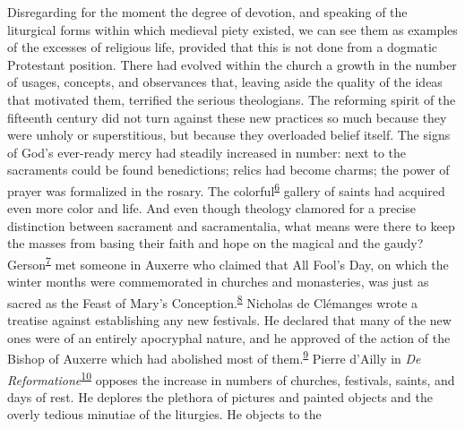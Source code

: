 Disregarding for the moment the degree of devotion, and speaking of the
liturgical forms within which medieval piety existed, we can see them as
examples of the excesses of religious life, provided that this is not
done from a dogmatic Protestant position. There had evolved within the
church a growth in the number of usages, concepts, and observances that,
leaving aside the quality of the ideas that motivated them, terrified
the serious theologians. The reforming spirit of the fifteenth century
did not turn against these new practices so much because they were
unholy or superstitious, but because they overloaded belief itself. The
signs of God's
ever-\protect\hypertarget{13_Chapter_Six__THE_DEPICTION_OF_TH.xhtmlux5cux23page_175}{}{}ready
mercy had steadily increased in number: next to the sacraments could be
found benedictions; relics had become charms; the power of prayer was
formalized in the rosary. The
colorful\textsuperscript{\protect\hypertarget{13_Chapter_Six__THE_DEPICTION_OF_TH.xhtmlux5cux23id_1259}{\protect\hyperlink{23_NOTES.xhtmlux5cux23id_1260}{6}}}
gallery of saints had acquired even more color and life. And even though
theology clamored for a precise distinction between sacrament and
sacramentalia, what means were there to keep the masses from basing
their faith and hope on the magical and the gaudy?
Gerson\textsuperscript{\protect\hypertarget{13_Chapter_Six__THE_DEPICTION_OF_TH.xhtmlux5cux23id_1257}{\protect\hyperlink{23_NOTES.xhtmlux5cux23id_1258}{7}}}
met someone in Auxerre who claimed that All Fool's Day, on which the
winter months were commemorated in churches and monasteries, was just as
sacred as the Feast of Mary's
Conception.\textsuperscript{\protect\hypertarget{13_Chapter_Six__THE_DEPICTION_OF_TH.xhtmlux5cux23id_1255}{\protect\hyperlink{23_NOTES.xhtmlux5cux23id_1256}{8}}}
Nicholas de Clémanges wrote a treatise against establishing any new
festivals. He declared that many of the new ones were of an entirely
apocryphal nature, and he approved of the action of the Bishop of
Auxerre which had abolished most of
them.\textsuperscript{\protect\hypertarget{13_Chapter_Six__THE_DEPICTION_OF_TH.xhtmlux5cux23id_1253}{\protect\hyperlink{23_NOTES.xhtmlux5cux23id_1254}{9}}}
Pierre d'Ailly in \emph{De
Reformatione}\textsuperscript{\protect\hypertarget{13_Chapter_Six__THE_DEPICTION_OF_TH.xhtmlux5cux23id_1251}{\protect\hyperlink{23_NOTES.xhtmlux5cux23id_1252}{10}}}
opposes the increase in numbers of churches, festivals, saints, and days
of rest. He deplores the plethora of pictures and painted objects and
the overly tedious minutiae of the liturgies. He objects to the
